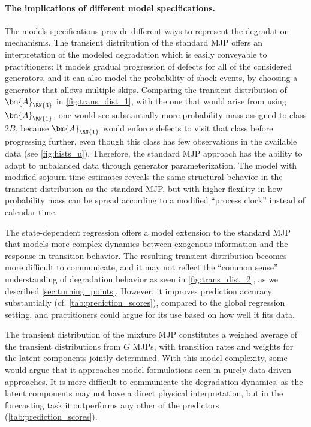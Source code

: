 \paragraph{The implications of different model specifications.}
The models specifications provide different ways to represent the degradation mechanisms. The transient distribution of the standard MJP offers an interpretation of the modeled degradation which is easily conveyable to practitioners: 
It models gradual progression of defects for all of the considered generators,
and it can also model the probability of shock events, by choosing a generator that allows multiple skips.
Comparing the transient distribution of $\bm{A}_{\RN{3}}$ in \cref{fig:trans_dist_1}, with the one that would arise from using $\bm{A}_{\RN{1}}$, one would see substantially more probability mass assigned to class $2B$, because $\bm{A}_{\RN{1}}$ would enforce defects to visit that class before progressing further, even though this class has few observations in the available data (see \cref{fig:hists_u}). Therefore, the standard MJP approach has the ability to adapt to unbalanced data through generator parameterization. 
The model with modified sojourn time estimates reveals the same structural behavior in the transient distribution as the standard MJP, but with higher flexility in how probability mass can be spread according to a modified ``process clock'' instead of calendar time.

The state-dependent regression offers a model extension to the standard MJP that models more complex dynamics between exogenous information and the response in transition behavior. The resulting transient distribution becomes more difficult to communicate, and it may not reflect the ``common sense'' understanding of degradation behavior as seen in \cref{fig:trans_dist_2}, as we described \cref{sec:turning_points}. However, it improves prediction accuracy substantially (cf. \cref{tab:prediction_scores}), compared to the global regression setting, and practitioners could argue for its use based on how well it fits data.

The transient distribution of the mixture MJP constitutes a weighed average of the transient distributions from $G$ MJPs, with transition rates and weights for the latent components jointly determined. With this model complexity, some would argue that it approaches model formulations seen in purely data-driven approaches. It is more difficult to communicate the degradation dynamics, as the latent components may not have a direct physical interpretation, but in the forecasting task it outperforms any other of the predictors (\cref{tab:prediction_scores}).


